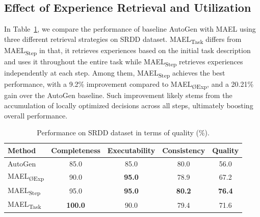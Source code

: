 \documentclass[preprint]{article}
\begin{document}
\subsection{Effect of Experience Retrieval and Utilization}
In Table~\ref{tab:quality}, we compare the performance of baseline AutoGen with MAEL using three different retrieval strategies on SRDD dataset.
MAEL\textsubscript{Task} differs from MAEL\textsubscript{Step} in that, it retrieves experiences based on the initial task description and uses it throughout the entire task while MAEL\textsubscript{Step} retrieves experiences independently at each step.
Among them, MAEL\textsubscript{Step} achieves the best performance, with a 9.2\% improvement compared to MAEL\textsubscript{ØExp}, and a 20.21\% gain over the AutoGen baseline.
Such improvement likely stems from the accumulation of locally optimized decisions across all steps, ultimately boosting overall performance.
\begin{table}[h]
\centering
\caption{Performance on SRDD dataset in terms of quality (\%).}
\label{tab:quality}
{ 

  
  
  \newcommand{\colavg}[1]{
    \cellcolor{basecol!
      \fpeval{round((#1-56.0)/(82.00-56.0)*90 + 10, 0)}
    }#1
  }

  \begin{tabular}{l|cccc}
    \toprule
       \textbf{Method} 
      & \textbf{Completeness} 
      & \textbf{Executability} 
      & \textbf{Consistency} 
      & \textbf{Quality} \\
    \midrule

    
    \rowcolor{gray!15}
    AutoGen                 
      & 85.0  & 85.0        & 80.0  
      & \colavg{56.0} \\
    \midrule

    
    MAEL\textsubscript{ØExp}
      & 90.0  & \textbf{95.0}
      & 78.9  
      & \colavg{67.2} \\

    
    \rowcolor{gray!15}
    MAEL\textsubscript{Step}
      & 95.0  & \textbf{95.0}
      & \textbf{80.2}
      & \textbf{\colavg{76.4}} \\

    
    MAEL\textsubscript{Task}
      & \textbf{100.0}
      & 90.0
      & 79.4
      & \colavg{71.6} \\
    \bottomrule
  \end{tabular}
} 

\end{table}
\end{document}
